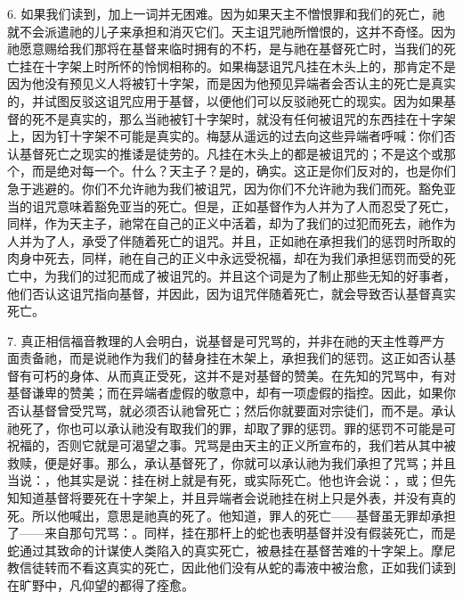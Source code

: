 6. 如果我们读到，加上一词并无困难。因为如果天主不憎恨罪和我们的死亡，祂就不会派遣祂的儿子来承担和消灭它们。天主诅咒祂所憎恨的，这并不奇怪。因为祂愿意赐给我们那将在基督来临时拥有的不朽，是与祂在基督死亡时，当我们的死亡挂在十字架上时所怀的怜悯相称的。如果梅瑟诅咒凡挂在木头上的，那肯定不是因为他没有预见义人将被钉十字架，而是因为他预见异端者会否认主的死亡是真实的，并试图反驳这诅咒应用于基督，以便他们可以反驳祂死亡的现实。因为如果基督的死不是真实的，那么当祂被钉十字架时，就没有任何被诅咒的东西挂在十字架上，因为钉十字架不可能是真实的。梅瑟从遥远的过去向这些异端者呼喊：你们否认基督死亡之现实的推诿是徒劳的。凡挂在木头上的都是被诅咒的；不是这个或那个，而是绝对每一个。什么？天主子？是的，确实。这正是你们反对的，也是你们急于逃避的。你们不允许祂为我们被诅咒，因为你们不允许祂为我们而死。豁免亚当的诅咒意味着豁免亚当的死亡。但是，正如基督作为人并为了人而忍受了死亡，同样，作为天主子，祂常在自己的正义中活着，却为了我们的过犯而死去，祂作为人并为了人，承受了伴随着死亡的诅咒。并且，正如祂在承担我们的惩罚时所取的肉身中死去，同样，祂在自己的正义中永远受祝福，却在为我们承担惩罚而受的死亡中，为我们的过犯而成了被诅咒的。并且这个词是为了制止那些无知的好事者，他们否认这诅咒指向基督，并因此，因为诅咒伴随着死亡，就会导致否认基督真实死亡。\par

7. 真正相信福音教理的人会明白，说基督是可咒骂的，并非在祂的天主性尊严方面责备祂，而是说祂作为我们的替身挂在木架上，承担我们的惩罚。这正如否认基督有可朽的身体、从而真正受死，这并不是对基督的赞美。在先知的咒骂中，有对基督谦卑的赞美；而在异端者虚假的敬意中，却有一项虚假的指控。因此，如果你否认基督曾受咒骂，就必须否认祂曾死亡；然后你就要面对宗徒们，而不是。承认祂死了，你也可以承认祂没有取我们的罪，却取了罪的惩罚。罪的惩罚不可能是可祝福的，否则它就是可渴望之事。咒骂是由天主的正义所宣布的，我们若从其中被救赎，便是好事。那么，承认基督死了，你就可以承认祂为我们承担了咒骂；并且当说：，他其实是说：挂在树上就是有死，或实际死亡。他也许会说：，或；但先知知道基督将要死在十字架上，并且异端者会说祂挂在树上只是外表，并没有真的死。所以他喊出，意思是祂真的死了。他知道，罪人的死亡——基督虽无罪却承担了——来自那句咒骂：。同样，挂在那杆上的蛇也表明基督并没有假装死亡，而是蛇通过其致命的计谋使人类陷入的真实死亡，被悬挂在基督苦难的十字架上。摩尼教信徒转而不看这真实的死亡，因此他们没有从蛇的毒液中被治愈，正如我们读到在旷野中，凡仰望的都得了痊愈。\par

